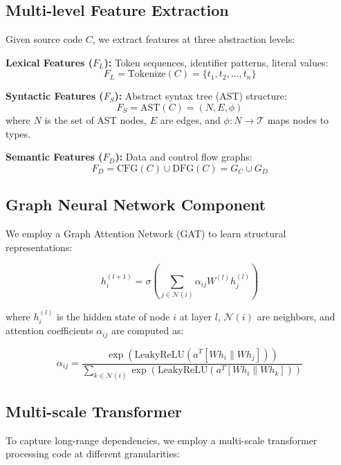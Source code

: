 \documentclass[10pt,journal,compsoc]{IEEEtran}
\begin{document}
\subsection{Multi-level Feature Extraction}
Given source code $C$, we extract features at three abstraction levels:

\textbf{Lexical Features ($F_L$):} Token sequences, identifier patterns, literal values:
\begin{equation}
F_L = \text{Tokenize}(C) = \{t_1, t_2, \ldots, t_n\}
\end{equation}

\textbf{Syntactic Features ($F_S$):} Abstract syntax tree (AST) structure:
\begin{equation}
F_S = \text{AST}(C) = (N, E, \phi)
\end{equation}
where $N$ is the set of AST nodes, $E$ are edges, and $\phi: N \to \mathcal{T}$ maps nodes to types.

\textbf{Semantic Features ($F_D$):} Data and control flow graphs:
\begin{equation}
F_D = \text{CFG}(C) \cup \text{DFG}(C) = G_C \cup G_D
\end{equation}

\subsection{Graph Neural Network Component}
We employ a Graph Attention Network (GAT) \cite{velickovic2018graph} to learn structural representations:

\begin{equation}
h_i^{(l+1)} = \sigma\left(\sum_{j \in \mathcal{N}(i)} \alpha_{ij} W^{(l)} h_j^{(l)}\right)
\end{equation}

where $h_i^{(l)}$ is the hidden state of node $i$ at layer $l$, $\mathcal{N}(i)$ are neighbors, and attention coefficients $\alpha_{ij}$ are computed as:

\begin{equation}
\alpha_{ij} = \frac{\exp(\text{LeakyReLU}(a^T [W h_i \| W h_j]))}{\sum_{k \in \mathcal{N}(i)} \exp(\text{LeakyReLU}(a^T [W h_i \| W h_k]))}
\end{equation}

\subsection{Multi-scale Transformer}
To capture long-range dependencies, we employ a multi-scale transformer processing code at different granularities:
\end{document}

